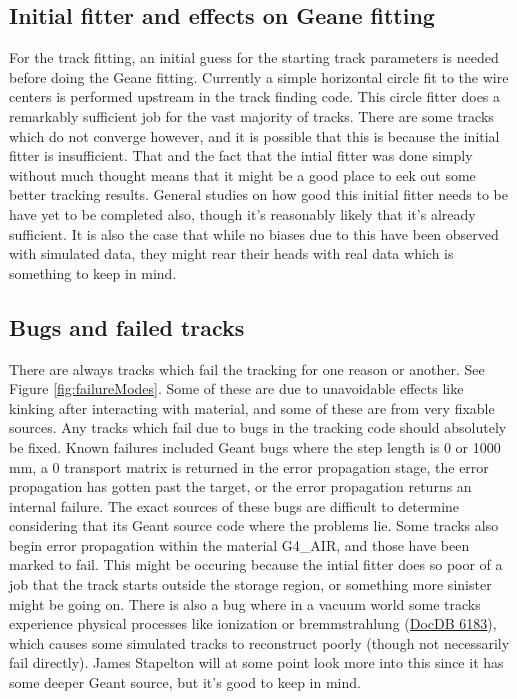 	\subsection{Initial fitter and effects on Geane fitting}

		For the track fitting, an initial guess for the starting track parameters is needed before doing the Geane fitting. Currently a simple horizontal circle fit to the wire centers is performed upstream in the track finding code. This circle fitter does a remarkably sufficient job for the vast majority of tracks. There are some tracks which do not converge however, and it is possible that this is because the initial fitter is insufficient. That and the fact that the intial fitter was done simply without much thought means that it might be a good place to eek out some better tracking results. General studies on how good this initial fitter needs to be have yet to be completed also, though it's reasonably likely that it's already sufficient. It is also the case that while no biases due to this have been observed with simulated data, they might rear their heads with real data which is something to keep in mind.

	\subsection{Bugs and failed tracks}

		There are always tracks which fail the tracking for one reason or another. See Figure \ref{fig:failureModes}. Some of these are due to unavoidable effects like kinking after interacting with material, and some of these are from very fixable sources. Any tracks which fail due to bugs in the tracking code should absolutely be fixed. Known failures included Geant bugs where the step length is 0 or 1000 mm, a 0 transport matrix is returned in the error propagation stage, the error propagation has gotten past the target, or the error propagation returns an internal failure. The exact sources of these bugs are difficult to determine considering that its Geant source code where the problems lie. Some tracks also begin error propagation within the material G4\_AIR, and those have been marked to fail. This might be occuring because the intial fitter does so poor of a job that the track starts outside the storage region, or something more sinister might be going on. There is also a bug where in a vacuum world some tracks experience physical processes like ionization or bremmstrahlung (\href{https://gm2-docdb.fnal.gov/cgi-bin/private/ShowDocument?docid=6183}{DocDB 6183}), which causes some simulated tracks to reconstruct poorly (though not necessarily fail directly). James Stapelton will at some point look more into this since it has some deeper Geant source, but it's good to keep in mind.

